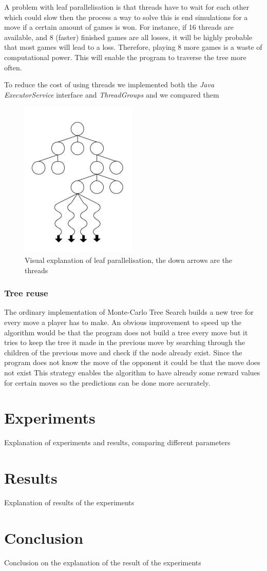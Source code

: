 \documentclass{ba-kecs}
\begin{document}
A problem with leaf parallelisation is that threads have to wait for each other which could slow then the process a way to solve this is end simulations for a move if a certain amount of games is won. For instance, if 16 threads are available, and 8 (faster) finished games are all losses, it will be highly probable that most games
will lead to a loss. Therefore, playing 8 more games is a waste of computational power. This will enable the program to traverse the tree more often.\cite{chaslot2008parallel}

To reduce the cost of using threads we implemented both the \textit{Java ExecutorService} interface and \textit{ThreadGroups} and we compared them
\begin{figure}
	\centering
	\includegraphics[]{figure_leafparallisation}
		\caption{Visual explanation of leaf parallelisation, the down arrows are the threads \cite{chaslot2008parallel}}
		\label{fig:leaf}
\end{figure}


\subsubsection{Tree reuse}
The ordinary implementation of Monte-Carlo Tree Search builds a new tree for every move a player has to make. An obvious improvement to speed up the algorithm would be that the program does not build a tree every move but it tries to keep the tree it made in the previous move by searching through the children of the previous move and check if the node already exist. Since the program does not know the move of the opponent it could be that the move does not exist This strategy enables the algorithm to have already some reward values for certain moves so the predictions can be done more accurately.

\section{Experiments}
Explanation of experiments and results, comparing different parameters
\section{Results}
Explanation of results of the experiments
\section{Conclusion}
Conclusion on the explanation of the result of the experiments

\end{document}
